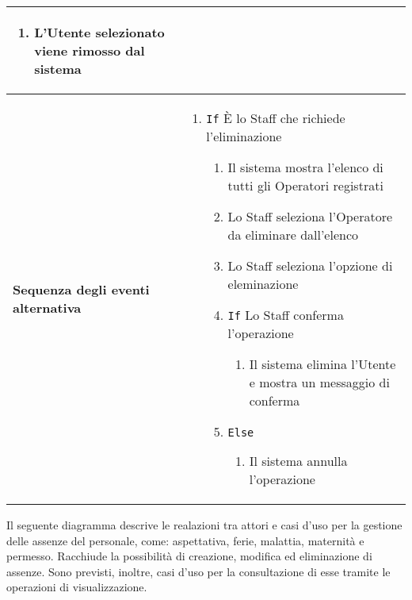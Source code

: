 \documentclass[a4paper]{report}
\begin{document}
\begin{table}[H]
\begin{tabular}{|p{3.9cm}|p{9.9cm}|}
\begin{enumerate}[leftmargin=14pt,label=\arabic*.,labelsep=0.5em,topsep=0pt,partopsep=0pt,parsep=0pt,itemsep=0pt]
    \begin{enumerate}[label=\arabic{enumi}.\arabic*.,leftmargin=22pt,labelsep=0.5em,topsep=0pt,partopsep=0pt,parsep=0pt,itemsep=0pt]
        \item L’Utente selezionato viene rimosso dal sistema
    \end{enumerate}
\end{enumerate} \\ \hline
\textbf{Sequenza degli eventi alternativa} & \begin{enumerate}[leftmargin=14pt,label=\arabic*.,labelsep=0.5em,topsep=0pt,partopsep=0pt,parsep=0pt,itemsep=0pt] 
    \item \texttt{If} È lo Staff che richiede l'eliminazione
    \begin{enumerate}[label=\arabic{enumi}.\arabic*.,leftmargin=22pt,labelsep=0.5em,topsep=0pt,partopsep=0pt,parsep=0pt,itemsep=0pt]
    \item Il sistema mostra l'elenco di tutti gli Operatori registrati
    \item Lo Staff seleziona l'Operatore da eliminare dall'elenco
    \item Lo Staff seleziona l'opzione di eleminazione
    \item \texttt{If} Lo Staff conferma l'operazione
    \begin{enumerate}[label=\arabic{enumi}.\arabic{enumii}.\arabic*.,leftmargin=22pt,labelsep=0.5em,topsep=0pt,partopsep=0pt,parsep=0pt,itemsep=0pt]
        \item Il sistema elimina l'Utente e mostra un messaggio di conferma
        \end{enumerate}
    \item \texttt{Else}
    \begin{enumerate}[label=\arabic{enumi}.\arabic{enumii}.\arabic*.,leftmargin=22pt,labelsep=0.5em,topsep=0pt,partopsep=0pt,parsep=0pt,itemsep=0pt]
        \item Il sistema annulla l'operazione
        \end{enumerate}
    \end{enumerate}
\end{enumerate}\\ \hline
\end{tabular}
\end{table}



\clearpage
{}

Il seguente diagramma descrive le realazioni tra attori e casi d'uso per la gestione delle assenze del personale, come: aspettativa, ferie, malattia, maternità e permesso.
Racchiude la possibilità di creazione, modifica ed eliminazione di assenze.
Sono previsti, inoltre, casi d'uso per la consultazione di esse tramite le operazioni di visualizzazione.
\end{document}
